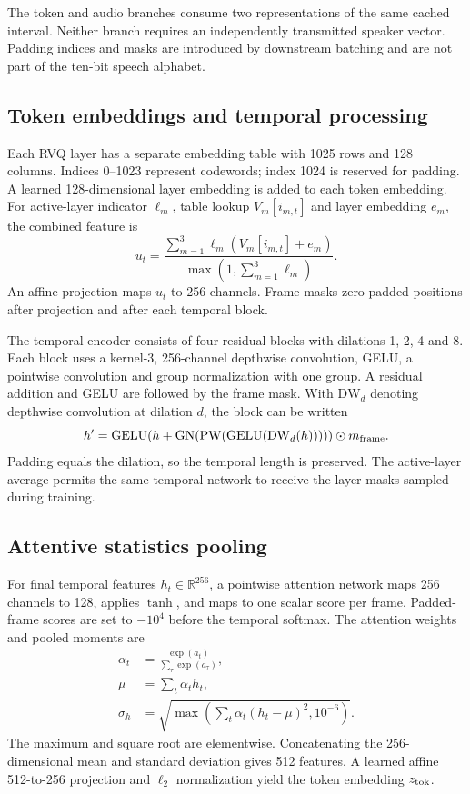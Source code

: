 The token and audio branches consume two representations of the same cached interval. Neither branch requires an independently transmitted speaker vector. Padding indices and masks are introduced by downstream batching and are not part of the ten-bit speech alphabet.

\subsection{Token embeddings and temporal processing}
Each RVQ layer has a separate embedding table with 1025 rows and 128 columns. Indices 0--1023 represent codewords; index 1024 is reserved for padding. A learned 128-dimensional layer embedding is added to each token embedding. For active-layer indicator $\ell_m$, table lookup $V_m[i_{m,t}]$ and layer embedding $e_m$, the combined feature is
\begin{equation}
 u_t=
 \frac{\sum_{m=1}^{3}\ell_m(V_m[i_{m,t}]+e_m)}
      {\max(1,\sum_{m=1}^{3}\ell_m)}.
 \label{eq:sv2-layer-mean}
\end{equation}
An affine projection maps $u_t$ to 256 channels. Frame masks zero padded positions after projection and after each temporal block.

The temporal encoder consists of four residual blocks with dilations 1, 2, 4 and 8. Each block uses a kernel-3, 256-channel depthwise convolution, GELU, a pointwise convolution and group normalization with one group. A residual addition and GELU are followed by the frame mask. With $\mathrm{DW}_d$ denoting depthwise convolution at dilation $d$, the block can be written
\begin{equation}
 h'=\mathrm{GELU}\!\left(
 h+\mathrm{GN}\!\left(
 \mathrm{PW}(\mathrm{GELU}(\mathrm{DW}_d(h)))
 \right)\right)\odot m_{\rm frame}.
 \label{eq:sv2-temporal}
\end{equation}
Padding equals the dilation, so the temporal length is preserved. The active-layer average permits the same temporal network to receive the layer masks sampled during training.

\subsection{Attentive statistics pooling}
For final temporal features $h_t\in\mathbb{R}^{256}$, a pointwise attention network maps 256 channels to 128, applies $\tanh$, and maps to one scalar score per frame. Padded-frame scores are set to $-10^4$ before the temporal softmax. The attention weights and pooled moments are
\begin{align}
 \alpha_t&=\frac{\exp(a_t)}{\sum_{\tau}\exp(a_\tau)},\nonumber\\
 \mu&=\sum_t\alpha_t h_t,\nonumber\\
 \sigma_h&=\sqrt{\max\left(
           \sum_t\alpha_t(h_t-\mu)^2,10^{-6}\right)}.
 \label{eq:sv2-pooling}
\end{align}
The maximum and square root are elementwise. Concatenating the 256-dimensional mean and standard deviation gives 512 features. A learned affine 512-to-256 projection and $\ell_2$ normalization yield the token embedding $z_{\rm tok}$.

